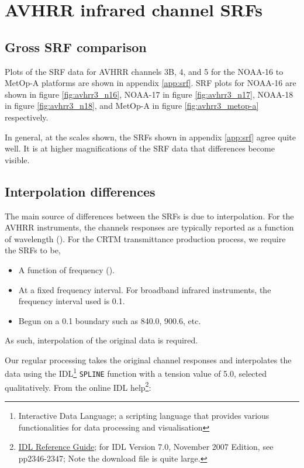\section{AVHRR infrared channel SRFs}
\subsection{Gross SRF comparison}
Plots of the SRF data for AVHRR channels 3B, 4, and 5 for the NOAA-16 to MetOp-A platforms are shown in appendix \ref{app:srf}. SRF plots for NOAA-16 are shown in figure \ref{fig:avhrr3_n16}, NOAA-17 in figure \ref{fig:avhrr3_n17}, NOAA-18 in figure \ref{fig:avhrr3_n18}, and MetOp-A in figure \ref{fig:avhrr3_metop-a} respectively.

In general, at the scales shown, the SRFs shown in appendix \ref{app:srf} agree quite well. It is at higher magnifications of the SRF data that differences become visible.


\subsection{Interpolation differences}
The main source of differences between the SRFs is due to interpolation. For the AVHRR instruments, the channels responses are typically reported as a function of wavelength (\micron). For the CRTM transmittance production process, we require the SRFs to be,
\begin{itemize}
  \item A function of frequency (\invcm).
  \item At a fixed frequency interval. For broadband infrared instruments, the frequency interval used is 0.1\invcm.
  \item Begun on a 0.1\invcm{} boundary such as 840.0, 900.6, etc.
\end{itemize}
As such, interpolation of the original data is required.

Our regular processing takes the original channel responses and interpolates the data using the IDL\footnote{Interactive Data Language; a scripting language that provides various functionalities for data processing and visualisation} \texttt{SPLINE} function with a tension value of 5.0, selected qualitatively. From the online IDL help\footnote{\href{http://www.ittvis.com/portals/0/pdfs/idl/refguide.pdf}{IDL Reference Guide}; for IDL Version 7.0, November 2007 Edition, see pp2346-2347; Note the download file is quite large.}:

